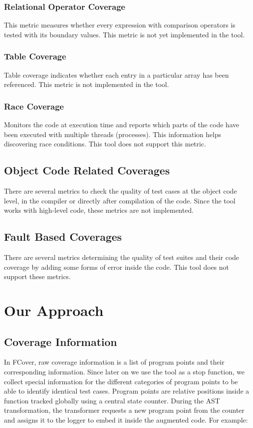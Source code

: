 \documentclass[12pt,a4paper]{report}
\begin{document}
\subsection{Relational Operator Coverage}
This metric measures whether every expression with comparison operators is tested with its boundary values.
This metric is not yet implemented in the tool.
 
\subsection{Table Coverage}
Table coverage indicates whether each entry in a particular array has been referenced.\cite{andersson2005automatic}
This metric is not implemented in the tool.

\subsection{Race Coverage}
Monitors the code at execution time and reports which parts of the code have been executed with multiple threads (processes). This information helps discovering race conditions. 
This tool does not support this metric.

\section{Object Code Related Coverages}
There are several metrics to check the quality of test cases at the object code level, in the compiler or directly after compilation of the code.
Since the tool works with high-level code, these metrics are not implemented.

\section{Fault Based Coverages}
There are several metrics determining the quality of test suites and their code coverage by adding some forms of error inside the code.
This tool does not support these metrics.

\chapter{Our Approach}
\newpage

\section{Coverage Information}
In FCover, raw coverage information is a list of program points and their corresponding information. Since later on we use the tool as a stop function, we collect special information for the different categories of program points to be able to identify identical test cases. Program points are relative positions inside a function tracked globally using a central state counter. During the AST transformation, the transformer requests a new program point from the counter and assigns it to the logger to embed it inside the augmented code. For example:
\end{document}
